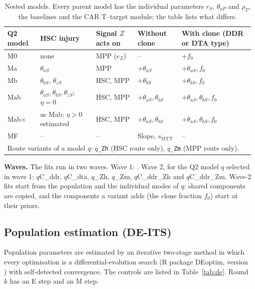 \documentclass[11pt]{article}
\begin{document}
\begin{table}[!htbp]
\centering\footnotesize
\setlength{\tabcolsep}{4pt}
\caption{Nested models. Every parent model has the individual parameters $r_S$, $\theta_{aP}$ and $\rho_T$, the baselines and the CAR T--target module; the table lists what differs.}\label{tab:models}
\begin{tabular}{lllll}
\toprule
Q2 model & HSC injury & Signal $Z$ acts on & Without clone & With clone (DDR or DTA type)\\
\midrule
M0 & none & MPP ($e_Z$) & -- & $+f_0$\\
Ma & $\theta_{aS}$ & MPP & $+\theta_{aS}$ & $+\theta_{aS},f_0$\\
Mb & $\theta_{bS}$, $\theta_{zS}$ & HSC, MPP & $+\theta_{bS}$ & $+\theta_{bS},f_0$\\
Mab & $\theta_{aS},\theta_{bS},\theta_{zS}$; $\eta=0$ & HSC, MPP & $+\theta_{aS},\theta_{bS}$ & $+\theta_{aS},\theta_{bS},f_0$\\
Mab$\times$ & as Mab; $\eta>0$ estimated & HSC, MPP & $+\theta_{aS},\theta_{bS}$ & $+\theta_{aS},\theta_{bS},f_0$\\
MF & -- & -- & Slope, $s_{\mathrm{MTT}}$ & --\\
\midrule
\multicolumn{5}{l}{Route variants of a model $q$: $q$\texttt{\_Zh} (HSC route only), $q$\texttt{\_Zm} (MPP route only).}\\
\bottomrule
\end{tabular}
\end{table}

\textbf{Waves.} The fits run in two waves. Wave 1: \valWaveOne. Wave 2, for the Q2 model $q$ selected in wave 1: $q$C\_ddr, $q$C\_dta, $q$\_Zh, $q$\_Zm, $q$C\_ddr\_Zh and $q$C\_ddr\_Zm. Wave-2 fits start from the population and the individual modes of $q$: shared components are copied, and the components a variant adds (the clone fraction $f_0$) start at their priors.












\subsection{Population estimation (DE-ITS)}\label{sec:its}
Population parameters are estimated by an iterative two-stage method \citep{steimer1984} in which every optimisation is a differential-evolution search (R package DEoptim, version \valDEoptim) with self-detected convergence. The controls are listed in Table~\ref{tab:de}. Round $k$ has an E step and an M step.
\end{document}
